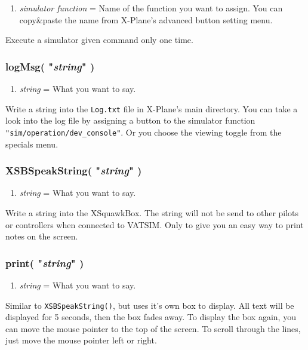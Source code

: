 \documentclass[11pt,parskip=half,a4paper]{scrartcl}
\begin{document}
\begin{enumerate}
	\item \emph{simulator function} = Name of the function you want to assign. You can copy\&paste the name from X-Plane's advanced button setting menu.
\end{enumerate}

Execute a simulator given command only one time.

\subsubsection{logMsg( "\emph{string}" )}

\begin{enumerate}
	\item \emph{string} = What you want to say.
\end{enumerate}

Write a string into the \verb|Log.txt| file in X-Plane's main directory. You can take a look into the log file by assigning a button to the simulator function \verb|"sim/operation/dev_console"|. Or you choose the viewing toggle from the specials menu.

\newpage
\subsubsection{XSBSpeakString( "\emph{string}" )}

\begin{enumerate}
	\item \emph{string} = What you want to say.
\end{enumerate}

Write a string into the XSquawkBox. The string will not be send to other pilots or controllers when connected to VATSIM. Only to give you an easy way to print notes on the screen.

\subsubsection{print( "\emph{string}" )}

\begin{enumerate}
	\item \emph{string} = What you want to say.
\end{enumerate}

Similar to \verb|XSBSpeakString()|, but uses it's own box to display. All text will be displayed for 5 seconds, then the box fades away. To display the box again, you can move the mouse pointer to the top of the screen. To scroll through the lines, just move the mouse pointer left or right.
\end{document}

